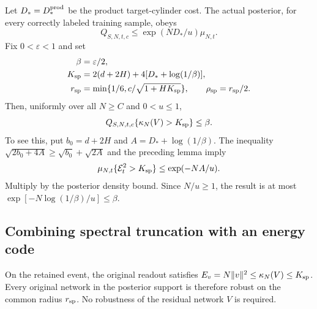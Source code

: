 Let $D_*=D_*^{\rm prod}$ be the product target-cylinder cost. The actual
posterior, for every correctly labeled training sample, obeys
\[
 Q_{S,N,t,c}\le\exp(ND_*/u)\mu_{N,t}.
\]
Fix $0<\varepsilon<1$ and set
\begin{equation}\label{eq:spectral-budget}
 \begin{split}
 \beta&=\varepsilon/2,\\
 K_{\rm sp}&=2(d+2H)+4[D_*+\log(1/\beta)],\\
 r_{\rm sp}&=\min\{1/6,c/\sqrt{1+HK_{\rm sp}}\},
 \qquad \rho_{\rm sp}=r_{\rm sp}/2.
 \end{split}
\end{equation}
Then, uniformly over all $N\ge C$ and $0<u\le1$,
\begin{equation}\label{eq:spectral-posterior-tail}
 Q_{S,N,t,c}\{\kappa_N(V)>K_{\rm sp}\}\le\beta.
\end{equation}
To see this, put $b_0=d+2H$ and $A=D_*+\log(1/\beta)$.
The inequality
$\sqrt{2b_0+4A}\ge\sqrt{b_0}+\sqrt{2A}$ and the preceding lemma imply
\[
 \mu_{N,t}\{\mathcal E_t^2>K_{\rm sp}\}
 \le \exp(-NA/u).
\]
Multiply by the posterior density bound. Since $N/u\ge1$, the result
is at most $\exp[-N\log(1/\beta)/u]\le\beta$.

\subsection{Combining spectral truncation with an energy code}

On the retained event, the original readout satisfies
$E_v=N\|v\|^2\le\kappa_N(V)\le K_{\rm sp}$.
Every original network in the posterior support is therefore robust on
the common radius $r_{\rm sp}$. No robustness of the residual network
$V$ is required.

